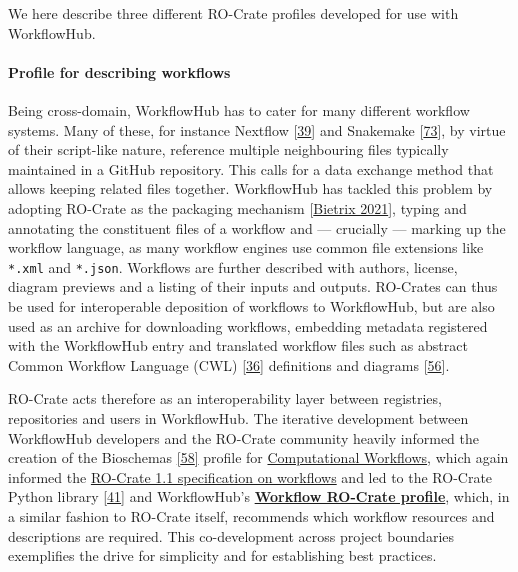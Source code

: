 We here describe three different RO-Crate profiles developed for use
with WorkflowHub.

\hypertarget{profile-for-describing-workflows}{%
\paragraph{Profile for describing
workflows}\label{profile-for-describing-workflows}}

Being cross-domain, WorkflowHub has to cater for many different workflow
systems. Many of these, for instance Nextflow
{[}\href{https://doi.org/10.1038/nbt.3820}{39}{]} and Snakemake
{[}\href{https://doi.org/10.1093/bioinformatics/bts480}{73}{]}, by
virtue of their script-like nature, reference multiple neighbouring
files typically maintained in a GitHub repository. This calls for a data
exchange method that allows keeping related files together. WorkflowHub
has tackled this problem by adopting RO-Crate as the packaging mechanism
{[}\href{https://doi.org/10.5281/zenodo.4705078}{Bietrix 2021}{]}, typing and
annotating the constituent files of a workflow and --- crucially ---
marking up the workflow language, as many workflow engines use common
file extensions like \texttt{*.xml} and \texttt{*.json}. Workflows are
further described with authors, license, diagram previews and a listing
of their inputs and outputs. RO-Crates can thus be used for
interoperable deposition of workflows to WorkflowHub, but are also used
as an archive for downloading workflows, embedding metadata registered
with the WorkflowHub entry and translated workflow files such as
abstract Common Workflow Language (CWL)
{[}\href{https://arxiv.org/abs/2105.07028}{36}{]} definitions and
diagrams {[}\href{https://doi.org/10.5281/zenodo.4605654}{56}{]}.

RO-Crate acts therefore as an interoperability layer between registries,
repositories and users in WorkflowHub. The iterative development between
WorkflowHub developers and the RO-Crate community heavily informed the
creation of the Bioschemas
\href{https://iswc2017.semanticweb.org/paper-579/}{{[}58{]}} profile for
\href{https://bioschemas.org/profiles/ComputationalWorkflow/1.0-RELEASE/}{Computational
Workflows}, which again informed the
\href{https://www.researchobject.org/ro-crate/1.1/workflows.html}{RO-Crate
1.1 specification on workflows} and led to the RO-Crate Python library
\href{https://doi.org/10.5281/zenodo.3956493}{{[}41{]}} and
WorkflowHub's
\href{https://w3id.org/workflowhub/workflow-ro-crate/1.0}{\textbf{Workflow
RO-Crate profile}}, which, in a similar fashion to RO-Crate itself,
recommends which workflow resources and descriptions are required. This
co-development across project boundaries exemplifies the drive for
simplicity and for establishing best practices.

